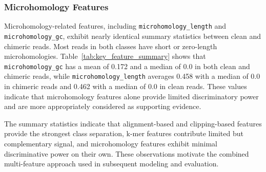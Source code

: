 \subsubsection{Microhomology Features}

Microhomology-related features, including \texttt{microhomology\_length} and \linebreak \texttt{microhomology\_gc}, exhibit nearly identical summary statistics between clean and chimeric reads. Most reads in both classes have short or zero-length microhomologies. Table~\ref{tab:key_feature_summary} shows that \texttt{microhomology\_gc} has a mean of 0.172 and a median of 0.0 in both clean and chimeric reads, while \texttt{microhomology\_length} averages 0.458 with a median of 0.0 in chimeric reads and 0.462 with a median of 0.0 in clean reads. These values indicate that microhomology features alone provide limited discriminatory power and are more appropriately considered as supporting evidence.

The summary statistics indicate that alignment-based and clipping-based features provide the strongest class separation, k-mer features contribute limited but complementary signal, and microhomology features exhibit minimal discriminative power on their own. These observations motivate the combined multi-feature approach used in subsequent modeling and evaluation.

